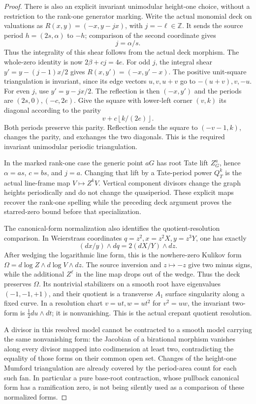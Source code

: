 \begin{proof}
There is also an explicit invariant unimodular height-one
choice, without a restriction to the rank-one generator
marking.  Write the actual monomial deck on valuations as
\(R(x,y)=(-x,y-jx)\), with \(j=-\ell\in\mathbb Z\).
It sends the source period \(h=(2s,\alpha)\) to
\(-h\); comparison of the second coordinate gives
\[
                         j=\alpha/s.
\]
Thus the integrality of this shear follows from the
actual deck morphism.  The whole-zero identity is now
\(2\beta+cj=4e\).  For odd \(j\), the integral
shear \(y'=y-(j-1)x/2\) gives
\(R(x,y')=(-x,y'-x)\).  The positive unit-square
triangulation is invariant, since its edge vectors
\(u,v,u+v\) go to \(-(u+v),v,-u\).
For even \(j\), use \(y'=y-jx/2\).  The reflection
is then \((-x,y')\) and the periods are
\((2s,0),(-c,2e)\).  Give the square with lower-left
corner \((v,k)\) its diagonal according to the parity
\[
                       v+c\left\lfloor k/(2e)\right\rfloor.
\]
Both periods preserve this parity.  Reflection sends the
square to \((-v-1,k)\), changes the parity, and exchanges
the two diagonals.  This is the required invariant
unimodular periodic triangulation.

In the marked rank-one case the generic point \(aG\)
has root Tate lift \(Z_G^a\), hence \(\alpha=as\),
\(c=bs\), and \(j=a\).  Changing that lift by a
Tate-period power \(Q_T^k\) is the actual line-frame
map \(V\mapsto Z^kV\).  Vertical component divisors
change the graph heights periodically and do not change
the quasiperiod.  These explicit maps recover the
rank-one spelling while the preceding deck argument
proves the starred-zero bound before that specialization.

The canonical-form normalization also identifies the
quotient-resolution comparison.  In Weierstrass coordinates
\(q=z^2,x=z^2X,y=z^3Y\), one has exactly
\[
                  (dx/y)\wedge dq=2(dX/Y)\wedge dz.
\]
After wedging the logarithmic line form, this is the
nowhere-zero Kulikov form
\(\Omega=d\log Z\wedge d\log V\wedge dz\).
The source inversion and \(z\mapsto-z\) give two
minus signs, while the additional \(Z^{\ell}\) in the line
map drops out of the wedge.  Thus the deck preserves
\(\Omega\).  Its nontrivial stabilizers on a smooth
root have eigenvalues \((-1,-1,+1)\), and their quotient
is a transverse \(A_1\) surface singularity along a fixed
curve.  In a resolution chart \(v=ut,w=ut^2\) for
\(v^2=uw\), the invariant two-form is
\(\tfrac12du\wedge dt\); it is nonvanishing.  This
is the actual crepant quotient resolution.

A divisor in this resolved model cannot be contracted to
a smooth model carrying the same nonvanishing form: the
Jacobian of a birational morphism vanishes along every
divisor mapped into codimension at least two, contradicting
the equality of those forms on their common open set.
Changes of the height-one Mumford triangulation are already
covered by the period-area count for each such fan.  In
particular a pure base-root contraction, whose pullback
canonical form has a ramification zero, is not being
silently used as a comparison of these normalized forms.


\end{proof}
